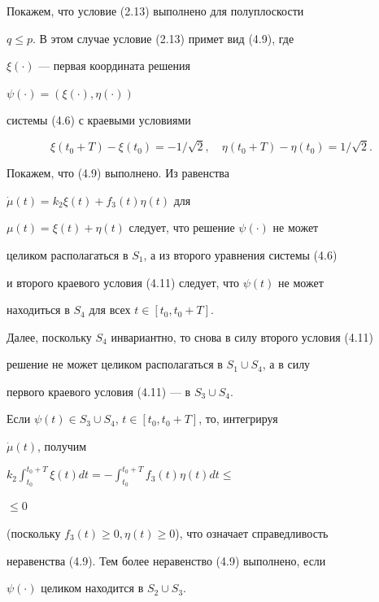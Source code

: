 Покажем, что условие (2.13) выполнено для полуплоскости


$q\le p$. В этом случае условие (2.13) примет вид (4.9), где


$\xi(\cdot)$ --- первая координата решения


$\psi(\cdot)=(\xi(\cdot),\eta(\cdot))$


системы (4.6) с краевыми условиями


%


\begin{equation}


\xi(t_0+T) - \xi(t_0) = -1/\sqrt{2},\quad


\eta(t_0+T) - \eta(t_0) = 1/\sqrt{2}.


\end{equation}


%


Покажем, что (4.9) выполнено. Из равенства


$\Dot \mu(t) = k_2\xi(t) + f_3(t)\eta(t)$ для


$\mu(t)=\xi(t) + \eta(t)$ следует, что решение $\psi(\cdot)$ не может


целиком располагаться в $S_1$, а из второго уравнения системы (4.6)


и второго краевого условия (4.11) следует, что $\psi(t)$ не может


находиться в $S_4$ для всех $t\in [t_0, t_0+T]$.


Далее, поскольку $S_4$ инвариантно, то снова в силу второго условия (4.11)


решение не может целиком располагаться в $S_1\cup S_4$,  а в силу


первого краевого условия (4.11) --- в $S_3\cup S_4$.


Если $\psi(t) \in S_3\cup S_4$, $t\in [t_0,t_0+T]$, то, интегрируя


$\Dot \mu(t)$, получим


$k_2\int_{t_0}^{t_0+T}\xi(t)dt=-\int_{t_0}^{t_0+T}f_3(t)\eta(t)dt\le$\linebreak




$\le 0$


(поскольку $f_3(t) \ge 0, \eta(t)\ge 0$), что означает справедливость


неравенства (4.9). Тем более неравенство (4.9) выполнено, если


$\psi(\cdot)$ целиком находится в $S_2\cup S_3$.





